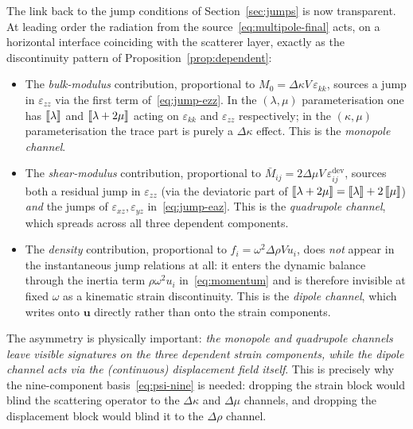 \documentclass[11pt,a4paper]{article}
\newcommand{\eps}{\varepsilon}
\newcommand{\uu}{\bm{u}}
\newcommand{\dev}{\mathrm{dev}}
\newcommand{\jump}[1]{\left[\kern-1.5pt\left[#1\right]\kern-1.5pt\right]}
\theoremstyle{plain}
\theoremstyle{definition}
\theoremstyle{remark}
\begin{document}
The link back to the jump conditions of Section~\ref{sec:jumps} is now
transparent.  At leading order the radiation from the
source~\eqref{eq:multipole-final} acts, on a horizontal interface
coinciding with the scatterer layer, exactly as the discontinuity
pattern of Proposition~\ref{prop:dependent}:
\begin{itemize}[leftmargin=1.4em]
  \item The \emph{bulk-modulus} contribution, proportional to
  $M_0 = \Delta\kappa V\,\eps_{kk}$, sources a jump in $\eps_{zz}$ via
  the first term of~\eqref{eq:jump-ezz}.  In the $(\lambda,\mu)$
  parameterisation one has
  $\jump{\lambda}$ and $\jump{\lambda+2\mu}$ acting on $\eps_{kk}$ and
  $\eps_{zz}$ respectively; in the $(\kappa,\mu)$ parameterisation the
  trace part is purely a $\Delta\kappa$ effect.  This is the
  \emph{monopole channel}.
  \item The \emph{shear-modulus} contribution, proportional to
  $\bar{M}_{ij}=2\Delta\mu V\,\eps_{ij}^{\dev}$, sources both a residual
  jump in $\eps_{zz}$ (via the deviatoric part of
  $\jump{\lambda+2\mu}=\jump{\lambda}+2\jump{\mu}$) \emph{and} the
  jumps of $\eps_{xz},\eps_{yz}$ in~\eqref{eq:jump-eaz}.  This is the
  \emph{quadrupole channel}, which spreads across all three dependent
  components.
  \item The \emph{density} contribution, proportional to
  $f_i=\omega^2\Delta\rho V u_i$, does \emph{not} appear in the
  instantaneous jump relations at all: it enters the dynamic balance
  through the inertia term $\rho\omega^2 u_i$ in~\eqref{eq:momentum}
  and is therefore invisible at fixed $\omega$ as a kinematic strain
  discontinuity.  This is the \emph{dipole channel}, which writes onto
  $\uu$ directly rather than onto the strain components.
\end{itemize}

The asymmetry is physically important: \emph{the monopole and
quadrupole channels leave visible signatures on the three dependent
strain components, while the dipole channel acts via the (continuous)
displacement field itself}.  This is precisely why the nine-component
basis~\eqref{eq:psi-nine} is needed: dropping the strain block would
blind the scattering operator to the $\Delta\kappa$ and $\Delta\mu$
channels, and dropping the displacement block would blind it to the
$\Delta\rho$ channel.

\end{document}
